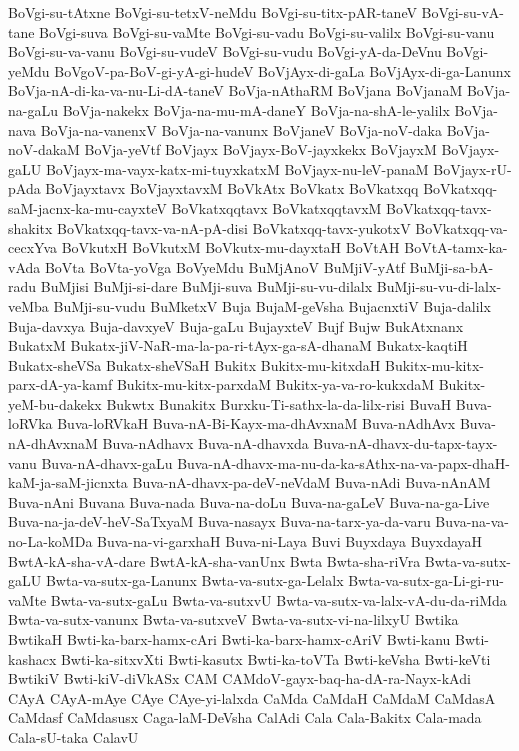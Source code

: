 {BoVgi-su-tAtxne
BoVgi-su-tetxV-neMdu
BoVgi-su-titx-pAR-taneV
BoVgi-su-vA-tane
BoVgi-suva
BoVgi-su-vaMte
BoVgi-su-vadu
BoVgi-su-valilx
BoVgi-su-vanu
BoVgi-su-va-vanu
BoVgi-su-vudeV
BoVgi-su-vudu
BoVgi-yA-da-DeVnu
BoVgi-yeMdu
BoVgoV-pa-BoV-gi-yA-gi-hudeV
BoVjAyx-di-gaLa
BoVjAyx-di-ga-Lanunx
BoVja-nA-di-ka-va-nu-Li-dA-taneV
BoVja-nAthaRM
BoVjana
BoVjanaM
BoVja-na-gaLu
BoVja-nakekx
BoVja-na-mu-mA-daneY
BoVja-na-shA-le-yalilx
BoVja-nava
BoVja-na-vanenxV
BoVja-na-vanunx
BoVjaneV
BoVja-noV-daka
BoVja-noV-dakaM
BoVja-yeVtf
BoVjayx
BoVjayx-BoV-jayxkekx
BoVjayxM
BoVjayx-gaLU
BoVjayx-ma-vayx-katx-mi-tuyxkatxM
BoVjayx-nu-leV-panaM
BoVjayx-rU-pAda
BoVjayxtavx
BoVjayxtavxM
BoVkAtx
BoVkatx
BoVkatxqq
BoVkatxqq-saM-jacnx-ka-mu-cayxteV
BoVkatxqqtavx
BoVkatxqqtavxM
BoVkatxqq-tavx-shakitx
BoVkatxqq-tavx-va-nA-pA-disi
BoVkatxqq-tavx-yukotxV
BoVkatxqq-va-cecxYva
BoVkutxH
BoVkutxM
BoVkutx-mu-dayxtaH
BoVtAH
BoVtA-tamx-ka-vAda
BoVta
BoVta-yoVga
BoVyeMdu
BuMjAnoV
BuMjiV-yAtf
BuMji-sa-bA-radu
BuMjisi
BuMji-si-dare
BuMji-suva
BuMji-su-vu-dilalx
BuMji-su-vu-di-lalx-veMba
BuMji-su-vudu
BuMketxV
Buja
BujaM-geVsha
BujacnxtiV
Buja-dalilx
Buja-davxya
Buja-davxyeV
Buja-gaLu
BujayxteV
Bujf
Bujw
BukAtxnanx
BukatxM
Bukatx-jiV-NaR-ma-la-pa-ri-tAyx-ga-sA-dhanaM
Bukatx-kaqtiH
Bukatx-sheVSa
Bukatx-sheVSaH
Bukitx
Bukitx-mu-kitxdaH
Bukitx-mu-kitx-parx-dA-ya-kamf
Bukitx-mu-kitx-parxdaM
Bukitx-ya-va-ro-kukxdaM
Bukitx-yeM-bu-dakekx
Bukwtx
Bunakitx
Burxku-Ti-sathx-la-da-lilx-risi
BuvaH
Buva-loRVka
Buva-loRVkaH
Buva-nA-Bi-Kayx-ma-dhAvxnaM
Buva-nAdhAvx
Buva-nA-dhAvxnaM
Buva-nAdhavx
Buva-nA-dhavxda
Buva-nA-dhavx-du-tapx-tayx-vanu
Buva-nA-dhavx-gaLu
Buva-nA-dhavx-ma-nu-da-ka-sAthx-na-va-papx-dhaH-kaM-ja-saM-jicnxta
Buva-nA-dhavx-pa-deV-neVdaM
Buva-nAdi
Buva-nAnAM
Buva-nAni
Buvana
Buva-nada
Buva-na-doLu
Buva-na-gaLeV
Buva-na-ga-Live
Buva-na-ja-deV-heV-SaTxyaM
Buva-nasayx
Buva-na-tarx-ya-da-varu
Buva-na-va-no-La-koMDa
Buva-na-vi-garxhaH
Buva-ni-Laya
Buvi
Buyxdaya
BuyxdayaH
BwtA-kA-sha-vA-dare
BwtA-kA-sha-vanUnx
Bwta
Bwta-sha-riVra
Bwta-va-sutx-gaLU
Bwta-va-sutx-ga-Lanunx
Bwta-va-sutx-ga-Lelalx
Bwta-va-sutx-ga-Li-gi-ru-vaMte
Bwta-va-sutx-gaLu
Bwta-va-sutxvU
Bwta-va-sutx-va-lalx-vA-du-da-riMda
Bwta-va-sutx-vanunx
Bwta-va-sutxveV
Bwta-va-sutx-vi-na-lilxyU
Bwtika
BwtikaH
Bwti-ka-barx-hamx-cAri
Bwti-ka-barx-hamx-cAriV
Bwti-kanu
Bwti-kashacx
Bwti-ka-sitxvXti
Bwti-kasutx
Bwti-ka-toVTa
Bwti-keVsha
Bwti-keVti
BwtikiV
Bwti-kiV-diVkASx
CAM
CAMdoV-gayx-baq-ha-dA-ra-Nayx-kAdi
CAyA
CAyA-mAye
CAye
CAye-yi-lalxda
CaMda
CaMdaH
CaMdaM
CaMdasA
CaMdasf
CaMdasusx
Caga-laM-DeVsha
CalAdi
Cala
Cala-Bakitx
Cala-mada
Cala-sU-taka
CalavU
}
